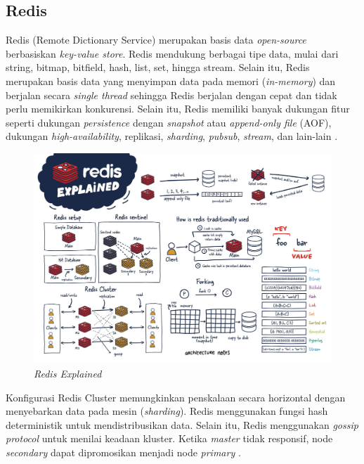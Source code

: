 \subsection{Redis}

Redis (Remote Dictionary Service) merupakan basis data \textit{open-source} berbasiskan \textit{key-value store}. Redis mendukung berbagai tipe data, mulai dari string, bitmap, bitfield, hash, list, set, hingga stream. Selain itu, Redis merupakan basis data yang menyimpan data pada memori (\textit{in-memory}) dan berjalan secara \textit{single thread} sehingga Redis berjalan dengan cepat dan tidak perlu memikirkan konkurensi. Selain itu, Redis memiliki banyak dukungan fitur seperti dukungan \textit{persistence} dengan \textit{snapshot} atau \textit{append-only file} (AOF), dukungan \textit{high-availability}, replikasi, \textit{sharding}, \textit{pubsub}, \textit{stream}, dan lain-lain \parencite{redisExplained}.

\begin{figure}[htbp]
    \centering
    \includegraphics[width=1\textwidth]{resources/chapter-2/redis.jpg}
    \caption{\textit{Redis Explained \parencite{redisExplained}}}
    \label{fig:redis-explained}
\end{figure}

Konfigurasi Redis Cluster memungkinkan penskalaan secara horizontal dengan menyebarkan data pada mesin (\textit{sharding}). Redis menggunakan fungsi hash deterministik untuk mendistribusikan data. Selain itu, Redis menggunakan \textit{gossip protocol} untuk menilai keadaan kluster. Ketika \textit{master} tidak responsif, node \textit{secondary} dapat dipromosikan menjadi node \textit{primary} \parencite{redisExplained}.